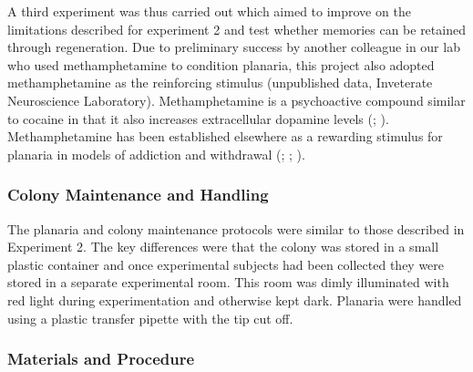 \documentclass[
  jou,
  floatsintext,
  longtable,
  nolmodern,
  notxfonts,
  notimes,
  donotrepeattitle,
  colorlinks=true,linkcolor=blue,citecolor=blue,urlcolor=blue]{apa7}
\begin{document}
A third experiment was thus carried out which aimed to improve on the
limitations described for experiment 2 and test whether memories can be
retained through regeneration. Due to preliminary success by another
colleague in our lab who used methamphetamine to condition planaria,
this project also adopted methamphetamine as the reinforcing stimulus
(unpublished data, Inveterate Neuroscience Laboratory). Methamphetamine
is a psychoactive compound similar to cocaine in that it also increases
extracellular dopamine levels
(;
).
Methamphetamine has been established elsewhere as a rewarding stimulus
for planaria in models of addiction and withdrawal
(;
;
).

\subsubsection{Colony Maintenance and
Handling}\label{colony-maintenance-and-handling-2}

The planaria and colony maintenance protocols were similar to those
described in Experiment 2. The key differences were that the colony was
stored in a small plastic container and once experimental subjects had
been collected they were stored in a separate experimental room. This
room was dimly illuminated with red light during experimentation and
otherwise kept dark. Planaria were handled using a plastic transfer
pipette with the tip cut off.

\subsubsection{Materials and
Procedure}\label{sec-exp-3-materials-and-methods}
\end{document}
